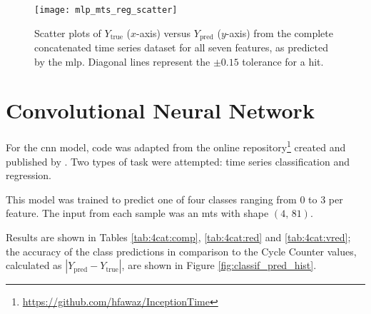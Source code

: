 \begin{figure}
    \centering
    \texttt{[image: mlp\_mts\_reg\_scatter]}
    \caption{\label{fig:mlp_mts_reg_scatter} Scatter plots of \(Y_\text{true}\) (\(x\)-axis) versus \(Y_\text{pred}\) (\(y\)-axis) from the complete concatenated time series dataset for all seven features, as predicted by the \ac{mlp}. Diagonal lines represent the \(\pm0.15\) tolerance for a hit.}
\end{figure}

\section{Convolutional Neural Network}
For the \ac{cnn} model, code was adapted from the online repository\footnote{\url{https://github.com/hfawaz/InceptionTime}} created and published by \citet[]{fawaz_inceptiontime_2019}. Two types of task were attempted: time series classification and regression.

This model was trained to predict one of four classes ranging from 0 to 3 per feature. The input from each sample was an \ac{mts} with shape \(\left(4,\,81\right)\).


Results are shown in Tables \ref{tab:4cat:comp}, \ref{tab:4cat:red} and \ref{tab:4cat:vred}; the accuracy of the class predictions in comparison to the Cycle Counter values, calculated as \(\left|Y_\text{pred} - Y_\text{true}\right|\), are shown in Figure \ref{fig:classif_pred_hist}.

